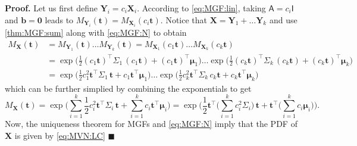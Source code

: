 \documentclass[10pt]{article}
\theoremstyle{definition}
\newenvironment{prf}{\noindent\textbf{Proof.}}{\hfill$\blacksquare$}
\begin{document}
\begin{prf}
Let us first define $\mathbf{Y}_i=c_i\mathbf{X}_i$. According to \cref{eq:MGF:lin}, taking $\mathsf{A}=c_i\mathsf{I}$ and $\mathbf{b}=\mathbf{0}$ leads to $M_{\mathbf{Y}_i}(\mathbf{t})=M_{\mathbf{X}_i}(c_i\mathbf{t})$.  Notice that $\mathbf{X} = \mathbf{Y}_1 + \dots \mathbf{Y}_k$ and use \cref{thm:MGF:sum} along with \cref{eq:MGF:N} to obtain
\begin{align*}
M_{\mathbf{X}}(\mathbf{t}) &= M_{\mathbf{Y}_1}(\mathbf{t}) \dots M_{\mathbf{Y}_k}(\mathbf{t}) 
= M_{\mathbf{X}_1}(c_1\mathbf{t}) \dots M_{\mathbf{X}_k}(c_k\mathbf{t}) \\
&= \exp\Big(\frac{1}{2}(c_1\mathbf{t})^{\top}\mathsf{\Sigma}_1\,(c_1\mathbf{t})+(c_1\mathbf{t})^{\top}\boldsymbol{\mu}_1\Big) \dots
\exp\Big(\frac{1}{2}(c_k\mathbf{t})^{\top}\mathsf{\Sigma}_k\,(c_k\mathbf{t})+(c_k\mathbf{t})^{\top}\boldsymbol{\mu}_k\Big) \\
&= \exp\Big(\frac{1}{2}c_1^2\mathbf{t}^{\top}\mathsf{\Sigma}_1\,\mathbf{t}+c_1\mathbf{t}^{\top}\boldsymbol{\mu}_1\Big) \dots
\exp\Big(\frac{1}{2}c_k^2\mathbf{t}^{\top}\mathsf{\Sigma}_k\,c_k\mathbf{t}+c_k\mathbf{t}^{\top}\boldsymbol{\mu}_k\Big) 
\end{align*}
which can be further simplied by combining the exponentials to get
\begin{equation*}
M_{\mathbf{X}}(\mathbf{t}) 
= \exp\Big( \sum_{i=1}^{k}\frac{1}{2}c_i^2\mathbf{t}^{\top}\mathsf{\Sigma}_i\,\mathbf{t}  + \sum_{i=1}^{k} c_i\mathbf{t}^{\top}\boldsymbol{\mu}_i \Big) 
= \exp\Big( \frac{1}{2}\mathbf{t}^{\top}\Big(\sum_{i=1}^{k}c_i^2\mathsf{\Sigma}_i\Big)\,\mathbf{t}  + \mathbf{t}^{\top}\Big(\sum_{i=1}^{k} c_i\boldsymbol{\mu}_i \Big)\Big).
\end{equation*}
Now, the uniqueness theorem for MGFs and \cref{eq:MGF:N} imply that the PDF of $\mathbf{X}$ is given by \cref{eq:MVN:LC}
\end{prf}
\end{document}
